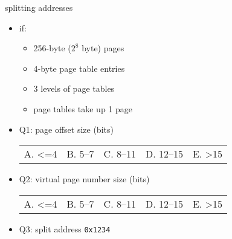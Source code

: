 \begin{frame}{splitting addresses}
\begin{itemize}
\item if:
    \begin{itemize}
    \item 256-byte ($2^8$ byte) pages
    \item 4-byte page table entries
    \item 3 levels of page tables
    \item page tables take up 1 page
    \end{itemize}
\item Q1: page offset size (bits)
\begin{tabular}{lllll}
A. <=4 & B. 5--7 & C. 8--11 & D. 12--15 & E. >15
\end{tabular}
\item Q2: virtual page number size (bits)
\begin{tabular}{lllll}
A. <=4 & B. 5--7 & C. 8--11 & D. 12--15 & E. >15
\end{tabular}
\item Q3: split address \texttt{0x1234}
\end{itemize}
\end{frame}

